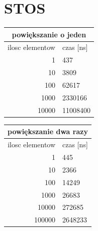 \documentclass[a4paper,11pt]{report}
\begin{document}
\section{STOS}
\begin{tabular}{|rl|}
\hline
\multicolumn{2}{|c|}{powiększanie o jeden}\\
\hline
ilosc elementow & czas [ns]\\
\hline
1&437\\
10&3809\\
100&62617\\
1000&2330166\\
10000&11008400\\
\hline
\end{tabular}
\newline
\newline
\newline
\begin{tabular}{|rl|}
\hline
\multicolumn{2}{|c|}{powiększanie dwa razy}\\
\hline
ilosc elementow & czas [ns]\\
\hline
1&445\\
10&2366\\
100&14249\\
1000&26683\\
10000&272685\\
100000&2648233\\
\hline
\end{tabular}
\newline
\newline
\end{document}

